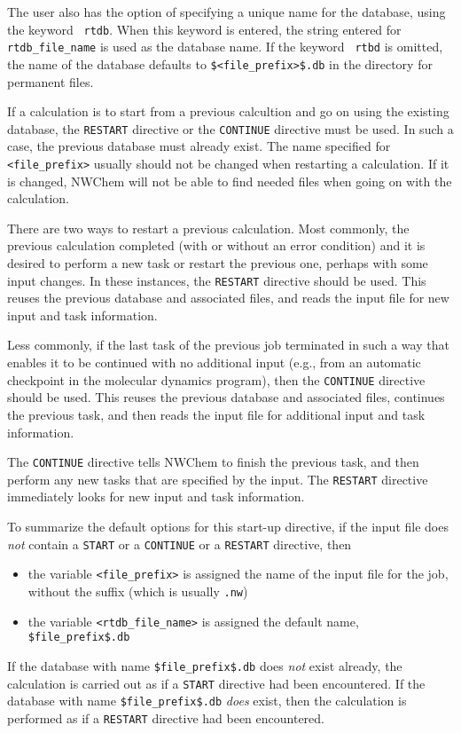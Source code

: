 The user also has the option of
specifying a unique name for the database, using the keyword {\tt
  rtdb}.  When this keyword is entered, the string entered for {\tt
  rtdb\_file\_name} is used as the database name.  If the keyword {\tt
  rtbd} is omitted, the name of the database defaults to
\verb+$<file_prefix>$.db+ in the directory for permanent files.

If a calculation is to start from a previous calcultion and go on
using the existing database, the \verb+RESTART+ directive or the
\verb+CONTINUE+ directive must be used.  In such a case, the previous
database must already exist.  The name specified for {\tt <file\_prefix>} 
usually should
not be changed when restarting a calculation.  If it is changed, NWChem 
will not
be able to find needed files when going on with the
calculation.

There are two ways to restart a previous calculation.  Most commonly,
the previous calculation completed (with or without an error
condition) and it is desired to perform a new task or restart the
previous one, perhaps with some input changes.  In these instances,
the \verb+RESTART+ directive should be used.  This reuses the previous
database and associated files, and reads the input file for new input
and task information.

Less commonly, if the last task of the previous job terminated in such
a way that enables it to be continued with no additional
input (e.g., from an automatic
checkpoint in the molecular dynamics program), then the 
\verb+CONTINUE+ directive should be used.  This reuses
the previous database and associated files, continues the previous
task, and then reads the input file for additional input and task
information.

The \verb+CONTINUE+ directive tells NWChem to finish the
previous task, and then perform any new tasks that are specified by
the input. The \verb+RESTART+ directive immediately looks for new
input and task information.

To summarize the default options for this start-up directive, if the 
input file does {\em not} contain a \verb+START+ or a \verb+CONTINUE+ or a
\verb+RESTART+ directive, then
\begin{itemize}
  \item the variable {\tt <file\_prefix>} is assigned the name of the 
input file for the job, without the suffix (which is usually \verb+.nw+)
  \item the variable {\tt <rtdb\_file\_name>} is assigned the default name,
\verb+$file_prefix$.db+
\end{itemize}
If the database with name \verb+$file_prefix$.db+ does {\it not} 
exist already,
the calculation is carried out as if a \verb+START+ directive had
been encountered.  If the database with name \verb+$file_prefix$.db+
{\it does} exist, then the calculation is performed as if a
\verb+RESTART+ directive had been encountered.  

